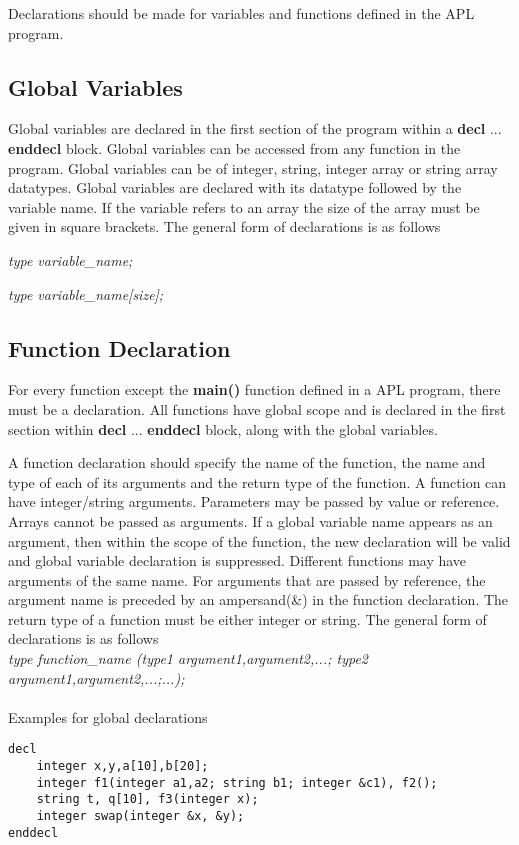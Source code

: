 \documentclass[11pt]{article}
\begin{document}
Declarations should be made for  variables and functions defined in the APL program.




\subsection{Global Variables}
Global variables are declared in the first section of the program within a \textbf{decl} ... \textbf{enddecl} block. Global variables can be accessed from any function in the program. Global variables can be of integer, string, integer array or string array datatypes. Global variables are declared with its datatype followed by the variable name. If the variable refers to an array the size of the array must be given in square brackets. The general form of declarations is as follows 

\textit{type variable\_name;} 

\textit{type variable\_name[size];}





\subsection{Function Declaration}
For every function except the \textbf{main()} function defined in a APL program, there must be a declaration. All functions have global scope and is declared in the first section within  \textbf{decl} ... \textbf{enddecl} block, along with the global variables.

A function declaration should specify the name of the function, the name and type of each of its arguments and the return type of the function. A function can have integer/string arguments. Parameters may be passed by value or reference. Arrays cannot be passed as arguments. If a global variable name appears as an argument, then within the scope of the function, the new declaration will be valid and global variable declaration is suppressed. Different functions may have arguments of the same name. For arguments that are passed by reference, the argument name is preceded by an ampersand(\&) in the function declaration. The return type of a function must be either integer or string. The general form of declarations is as follows \\ 

\textit{type function\_name (type1 argument1,argument2,...; type2 argument1,argument2,...;...);}
\\
\\
Examples for global declarations
\begin{lstlisting}
decl
	integer x,y,a[10],b[20];	
	integer f1(integer a1,a2; string b1; integer &c1), f2(); 
	string t, q[10], f3(integer x); 
	integer swap(integer &x, &y);	 
enddecl
\end{lstlisting}
\end{document}
